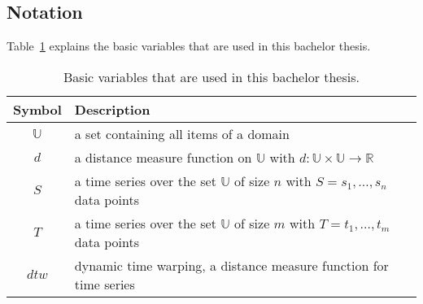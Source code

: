 \subsection{Notation}
Table~\ref{tab:notation} explains the basic variables that are used in this bachelor thesis.

\begin{table}
    \begin{center}
        \begin{tabularx}{\textwidth}{c X}
            \textbf{Symbol} & \textbf{Description}\\
            \hline
            $\mathbb{U}$ & a set containing all items of a domain\\
            $d$ & a distance measure function on $\mathbb{U}$ with $d: \mathbb{U} \times \mathbb{U} \to \mathbb{R}$\\
            $S$ & a time series over the set $\mathbb{U}$ of size $n$ with $S = s_1, \dots, s_n$ data points\\
            $T$ & a time series over the set $\mathbb{U}$ of size $m$ with $T = t_1, \dots, t_m$ data points\\
            $dtw$ & dynamic time warping, a distance measure function for time series
        \end{tabularx}
    \end{center}
    \caption{Basic variables that are used in this bachelor thesis.}
	\label{tab:notation}
\end{table}
